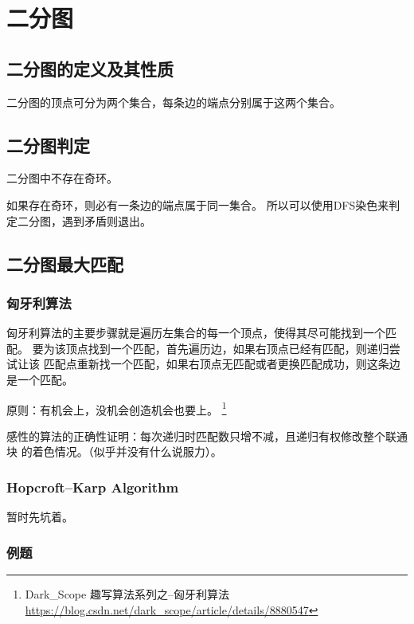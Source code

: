 \section{二分图}
\subsection{二分图的定义及其性质}
二分图的顶点可分为两个集合，每条边的端点分别属于这两个集合。
\subsection{二分图判定}
\begin{property}
	二分图中不存在奇环。
\end{property}
如果存在奇环，则必有一条边的端点属于同一集合。
所以可以使用DFS染色来判定二分图，遇到矛盾则退出。



\subsection{二分图最大匹配}

\subsubsection{匈牙利算法}

匈牙利算法的主要步骤就是遍历左集合的每一个顶点，使得其尽可能找到一个匹配。
要为该顶点找到一个匹配，首先遍历边，如果右顶点已经有匹配，则递归尝试让该
匹配点重新找一个匹配，如果右顶点无匹配或者更换匹配成功，则这条边是一个匹配。

原则：有机会上，没机会创造机会也要上。
\footnote{Dark\_Scope 趣写算法系列之--匈牙利算法
	\url{https://blog.csdn.net/dark\_scope/article/details/8880547}}

感性的算法的正确性证明：每次递归时匹配数只增不减，且递归有权修改整个联通块
的着色情况。（似乎并没有什么说服力）。


\subsubsection{Hopcroft–Karp Algorithm}
暂时先坑着。

\subsubsection{例题}


